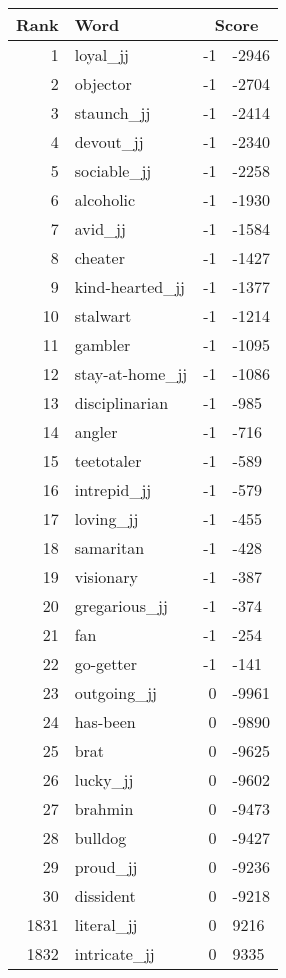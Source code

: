 \begin{longtable}[!htbp]{| rlr@{.}l |}
    \hline
    \textbf{Rank} & \textbf{Word} & \multicolumn{2}{c|}{\textbf{Score}} \\
    \hline
    \endhead
    1 & loyal\_jj & -1 & -2946 \\
    2 & objector & -1 & -2704 \\
    3 & staunch\_jj & -1 & -2414 \\
    4 & devout\_jj & -1 & -2340 \\
    5 & sociable\_jj & -1 & -2258 \\
    6 & alcoholic & -1 & -1930 \\
    7 & avid\_jj & -1 & -1584 \\
    8 & cheater & -1 & -1427 \\
    9 & kind-hearted\_jj & -1 & -1377 \\
    10 & stalwart & -1 & -1214 \\
    11 & gambler & -1 & -1095 \\
    12 & stay-at-home\_jj & -1 & -1086 \\
    13 & disciplinarian & -1 & -985 \\
    14 & angler & -1 & -716 \\
    15 & teetotaler & -1 & -589 \\
    16 & intrepid\_jj & -1 & -579 \\
    17 & loving\_jj & -1 & -455 \\
    18 & samaritan & -1 & -428 \\
    19 & visionary & -1 & -387 \\
    20 & gregarious\_jj & -1 & -374 \\
    21 & fan & -1 & -254 \\
    22 & go-getter & -1 & -141 \\
    23 & outgoing\_jj & 0 & -9961 \\
    24 & has-been & 0 & -9890 \\
    25 & brat & 0 & -9625 \\
    26 & lucky\_jj & 0 & -9602 \\
    27 & brahmin & 0 & -9473 \\
    28 & bulldog & 0 & -9427 \\
    29 & proud\_jj & 0 & -9236 \\
    30 & dissident & 0 & -9218 \\
    1831 & literal\_jj & 0 & 9216 \\
    1832 & intricate\_jj & 0 & 9335 \\

\end{longtable}
